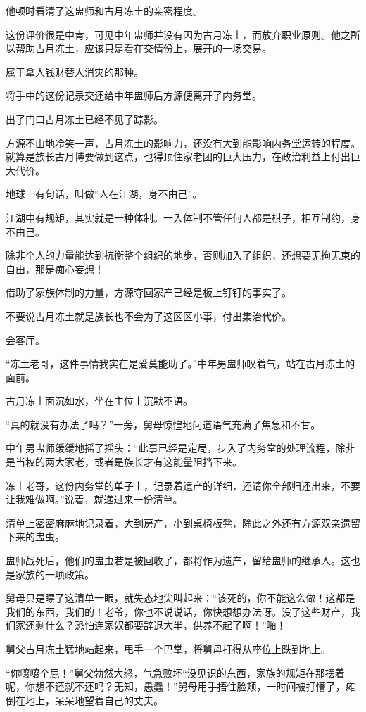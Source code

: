 \begin{this_body}
他顿时看清了这盅师和古月冻土的亲密程度。

这份评价很是中肯，可见中年盅师并没有因为古月冻土，而放弃职业原则。他之所以帮助古月冻土，应该只是看在交情份上，展开的一场交易。

属于拿人钱财替人消灾的那种。

将手中的这份记录交还给中年盅师后方源便离开了内务堂。

出了门口古月冻土已经不见了踪影。

方源不由地冷笑一声，古月冻土的影响力，还没有大到能影响内务堂运转的程度。就算是族长古月博要做到这点，也得顶住家老团的巨大压力，在政治利益上付出巨大代价。

地球上有句话，叫做“人在江湖，身不由己”。

江湖中有规矩，其实就是一种体制。一入体制不管任何人都是棋子，相互制约，身不由己。

除非个人的力量能达到抗衡整个组织的地步，否则加入了组织，还想要无拘无束的自由，那是痴心妄想！

借助了家族体制的力量，方源夺回家产已经是板上钉钉的事实了。

不要说古月冻土就是族长也不会为了这区区小事，付出集治代价。

会客厅。

“冻土老哥，这件事情我实在是爱莫能助了。”中年男盅师叹着气，站在古月冻土的面前。

古月冻土面沉如水，坐在主位上沉默不语。

“真的就没有办法了吗？”一旁，舅母惊惶地问道语气充满了焦急和不甘。

中年男盅师缓缓地摇了摇头：“此事已经是定局，步入了内务堂的处理流程，除非是当权的两大家老，或者是族长才有这能量阻挡下来。

冻土老哥，这份内务堂的单子上，记录着遗产的详细，还请你全部归还出来，不要让我难做啊。”说着，就递过来一份清单。

清单上密密麻麻地记录着，大到房产，小到桌椅板凳，除此之外还有方源双亲遗留下来的盅虫。

盅师战死后，他们的盅虫若是被回收了，都将作为遗产，留给盅师的继承人。这也是家族的一项政策。

舅母只是瞟了这清单一眼，就失态地尖叫起来：“该死的，你不能这么做！这都是我们的东西，我们的！老爷，你也不说说话，你快想想办法呀。没了这些财产，我们家还剩什么？恐怕连家奴都要辞退大半，供养不起了啊！”啪！

舅父古月冻土猛地站起来，甩手一个巴掌，将舅母打得从座位上跌到地上。

“你嚷嚷个屁！”舅父勃然大怒，气急败坏“没见识的东西，家族的规矩在那摆着呢，你想不还就不还吗？无知，愚蠢！”舅母用手捂住脸颊，一时间被打懵了，瘫倒在地上，呆呆地望着自己的丈夫。


\end{this_body}
